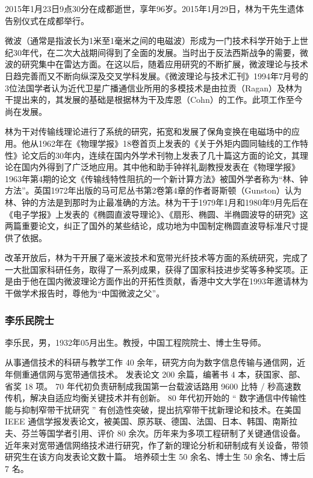 \documentclass[UTF8]{ctexart}
\begin{document}
2015年1月23日9点30分在成都逝世，享年96岁。2015年1月29日，林为干先生遗体告别仪式在成都举行。

微波（通常是指波长为1米至1毫米之间的电磁波）形成为一门技术科学开始于上世纪30年代，在二次大战期间得到了全面的发展。当时出于反法西斯战争的需要，微波的研究集中在雷达方面。在这以后，随着应用研究的不断扩展，微波理论与技术日趋完善而又不断向纵深及交叉学科发展。《微波理论与技术汇刊》1994年7月号的3位法国学者认为近代卫星广播通信业所用的多模技术是由拉贡（Ragan）及林为干提出来的，其发展的基础是根据林为干及库恩（Cohn）的工作。此项工作至今尚在发展。


林为干对传输线理论进行了系统的研究，拓宽和发展了保角变换在电磁场中的应用。他从1962年在《物理学报》18卷首页上发表的《关于外矩内圆同轴线的工作特性》论文后的30年内，连续在国内外学术刊物上发表了几十篇这方面的论文，其理论在国内外得到了广泛地应用。其中他和助手钟祥礼副教授发表在《物理学报》1963年第4期的论文《传输线特性阻抗的一个新计算方法》被国外学者称为“林、钟方法”。英国1972年出版的马可尼丛书第2卷第4章的作者哥斯顿（Gunston）认为林、钟的方法是到那时为止最准确的方法。林为干于1979年1月和1980年9月先后在《电子学报》上发表的《椭圆直波导理论》、《扇形、椭圆、半椭圆波导的研究》这两篇重要论文，纠正了国外的某些结论，成功地为中国制定椭圆直波导标准尺寸提供了依据。


改革开放后，林为干开展了毫米波技术和宽带光纤技术等方面的系统研究，完成了一大批国家科研任务，取得了一系列成果，获得了国家科技进步奖等多种奖项。正是由于他在国内微波理论方面作出的开拓性贡献，香港中文大学在1993年邀请林为干做学术报告时，尊他为“中国微波之父”。

    \subsubsection{李乐民院士}
李乐民，男，1932年05月出生。教授，中国工程院院士、博士生导师。

从事通信技术的科研与教学工作 40 余年，研究方向为数字信息传输与通信网，近年侧重通信网与宽带通信技术。 发表论文 200 余篇，编著书 4 本，获国家、部、省奖 18 项。 70 年代初负责研制成我国第一台载波话路用 9600 比特 / 秒高速数传机，解决自适应均衡关键技术并有创新。 80 年代初开始的 “ 数字通信中传输性能与抑制窄带干扰研究 ” 有创造性突破，提出抗窄带干扰新理论和技术。在美国 IEEE 通信学报发表论文，被美国、原苏联、德国、法国、日本、韩国、南斯拉夫、芬兰等国学者引用、评价 80 余次。历年来为多项工程研制了关键通信设备。近年来对宽带通信网络技术进行研究，作了新的理论分析和研制成有关设备，带领研究生在该方向发表论文数十篇。 培养硕士生 50 余名、博士生 50 余名、博士后 7 名。
\end{document}
